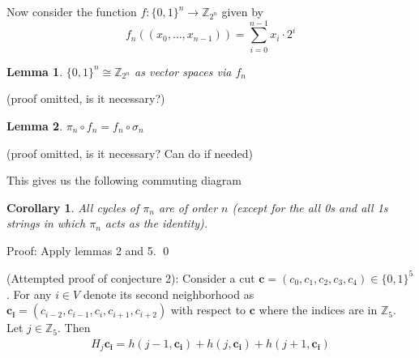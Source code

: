 \documentclass[10pt]{article}
\newtheorem{lemma}{Lemma}
\newtheorem{corollary}{Corollary}
\begin{document}
Now consider the function $f:\{0,1\}^n \rightarrow \mathbb{Z}_{2^n}$ given by 
\begin{equation}
    f_n((x_0, \dots, x_{n-1})) = \sum_{i=0}^{n-1} x_i \cdot 2^i
\end{equation}
\begin{lemma}
    $\{0,1\}^n \cong \mathbb{Z}_{2^n}$ as vector spaces via $f_n$
\end{lemma}
(proof omitted, is it necessary?)

\begin{lemma}
    $\pi_n \circ f_n = f_n \circ \sigma_n$
\end{lemma}
(proof omitted, is it necessary? Can do if needed)

This gives us the following commuting diagram




\begin{corollary}
All cycles of $\pi_n$ are of order $n$ (except for the all 0s and all 1s strings in which $\pi_n$ acts as the identity).
\end{corollary}
\noindent Proof: Apply lemmas 2 and 5. \qed

(Attempted proof of conjecture 2): Consider a cut $\textbf{c} = (c_0, c_1, c_2, c_3, c_4) \in \{0,1\}^5$. For any $i \in V$ denote its second neighborhood as $\boldsymbol{c_i} = (c_{i-2},c_{i-1},c_i,c_{i+1},c_{i+2})$ with respect to $\textbf{c}$ where the indices are in $\mathbb{Z}_5$. Let $j \in \mathbb{Z}_5$. Then
\begin{align*}
H_j \boldsymbol{c_i} = h(j-1, \boldsymbol{c_i}) + h(j,\boldsymbol{c_i}) + h(j + 1,\boldsymbol{c_i})
\end{align*}
\end{document}
